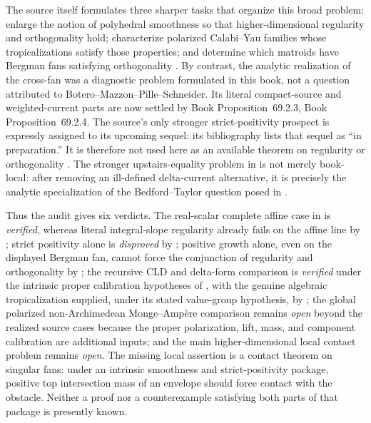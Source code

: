 \documentclass[11pt,a4paper]{article}
\theoremstyle{definition}
\theoremstyle{remark}
\begin{document}
The source itself formulates three sharper tasks that organize this broad
problem: enlarge the notion of polyhedral smoothness so that higher-dimensional
regularity and orthogonality hold; characterize polarized Calabi--Yau
families whose tropicalizations satisfy those properties; and determine
which matroids have Bergman fans satisfying orthogonality
\cite[pp.~3--5, \S1.5, and Remark~6.27]{BMPS26}.  By contrast, the analytic
realization of the cross-fan was a diagnostic problem formulated in this
book, not a question attributed to Botero--Mazzon--Pille--Schneider.  Its
literal compact-source and weighted-current parts are now settled by
Book Proposition~69.2.3, Book Proposition~69.2.4.
The source's only stronger strict-positivity prospect is expressly assigned
to its upcoming sequel: its bibliography lists that sequel as ``in
preparation.''  It is therefore not used here as an available theorem on
regularity or orthogonality \cite[pp.~5 and 60]{BMPS26}.
The stronger upstairs-equality problem in
 is not merely book-local: after
removing an ill-defined delta-current alternative, it is precisely the
analytic specialization of the Bedford--Taylor question posed in
\cite[\S8.6.1 and Definition~8.6.2]{CLD25}.

Thus the audit gives six verdicts.  The real-scalar complete affine case in
 is \emph{verified},
whereas literal integral-slope regularity already fails on the affine line
by ;
strict positivity alone is \emph{disproved} by
; positive growth alone,
even on the displayed Bergman fan, cannot force the conjunction of
regularity and orthogonality by
; the
recursive CLD and
delta-form comparison is \emph{verified} under the intrinsic proper
calibration hypotheses of
, with the genuine
algebraic tropicalization supplied, under its stated value-group
hypothesis, by ; the global polarized
non-Archimedean Monge--Amp\`ere comparison remains \emph{open} beyond the
realized source cases because the proper polarization, lift, mass, and
component calibration are additional inputs; and the main
higher-dimensional local contact problem remains \emph{open}.  The missing local
assertion is a contact theorem on singular fans: under an intrinsic
smoothness and strict-positivity package, positive top intersection mass of
an envelope should force contact with the obstacle.  Neither a proof nor a
counterexample satisfying both parts of that package is presently known.
\end{document}
